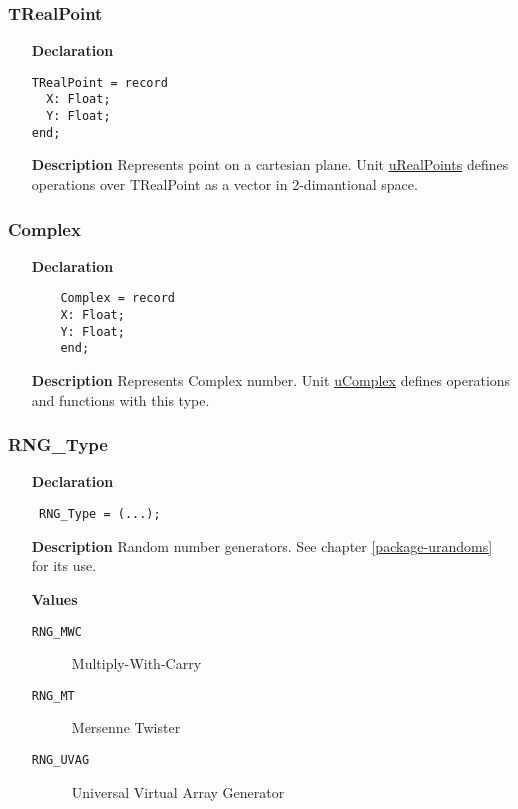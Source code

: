 \documentclass[12pt,a4paper,oneside]{report}
\newcommand{\lmath}[1]{   %
	\marginpar{\vspace{#1} 
		\begin{flushright}
			LMath
	\end{flushright} }
}
\newcommand{\declarationitem}[1]{\textbf{#1}}
\newcommand{\descriptiontitle}[1]{\textbf{#1}}
\newcommand{\code}[1]{\texttt{#1}}
\begin{document}
\subsubsection{TRealPoint}\label{types:trealpoint}
\lmath{-24pt}
\begin{itemize}
	\item[\declarationitem{Declaration}\hfill]

\begin{verbatim}
TRealPoint = record
  X: Float;
  Y: Float;
end;
\end{verbatim}
\item[\descriptiontitle{Description}]
Represents point on a cartesian plane. Unit \hyperref[uRealPoints]{uRealPoints} defines operations over TRealPoint as a vector in 2-dimantional space.
\end{itemize}
\subsubsection{Complex}\label{utypes-complex}
\begin{itemize}
	\item[\declarationitem{Declaration}\hfill]
	\begin{verbatim}
	Complex = record
	X: Float;
	Y: Float;
	end;
	\end{verbatim}
	\item[\descriptiontitle{Description}]
Represents Complex number. Unit \hyperref[ucomplex]{uComplex} defines operations and functions with this type.
\end{itemize}
\subsubsection{RNG{\_}Type}
\label{utypes-RNG_Type}
\begin{itemize}\item[\declarationitem{Declaration}\hfill]
	\begin{flushleft}
		\code{
			RNG{\_}Type = (...);}
		
	\end{flushleft}
	
	\par
	\item[\descriptiontitle{Description}]
	Random number generators. See chapter \ref{package-urandoms} for its use.
	\item[\textbf{Values}]
	\begin{description}
		\item[\texttt{RNG{\_}MWC}] Multiply{-}With{-}Carry
		\item[\texttt{RNG{\_}MT}] Mersenne Twister
		\item[\texttt{RNG{\_}UVAG}] Universal Virtual Array Generator
	\end{description}
\end{itemize}
\end{document}

